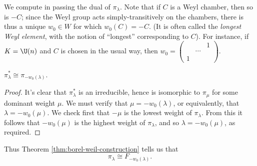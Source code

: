 \documentclass[reqno]{amsart} 
\begin{document}
We compute in passing the dual of $\pi_\lambda$.  Note that if $C$ is a Weyl chamber, then so is $-C$; since the Weyl group acts simply-transitively on the chambers, there is thus a unique $w_0 \in W$ for which $w_0(C) = - C$.  (It is often called the \emph{longest Weyl element}, with the notion of ``longest'' corresponding to $C$).  For instance, if $K = \U(n)$ and $C$ is chosen in the usual way, then $w_0 = 
\begin{pmatrix}
  &  & 1 \\
  & \dotsb &  \\
  1 & &
\end{pmatrix}
$.
\begin{lemma}
  $\pi_\lambda^* \cong \pi_{-w_0(\lambda)}$.
\end{lemma}
\begin{proof}
  It's clear that $\pi_\lambda^*$ is an irreducible, hence is isomorphic to $\pi_{\mu}$ for some dominant weight $\mu$.  We must verify that $\mu = - w_0 (\lambda)$, or equivalently, that $\lambda = - w_0(\mu)$.  We check first that $-\mu$ is the lowest weight of $\pi_\lambda$.  From this it follows that $- w_0 (\mu)$ is the highest weight of $\pi_\lambda$, and so $\lambda = - w_0(\mu)$, as required.
\end{proof}
Thus Theorem \ref{thm:borel-weil-construction} tells us that
\begin{equation}\label{eq:}
  \pi_{\lambda}
  \cong F_{-w_0(\lambda)}.
\end{equation}
\end{document}
